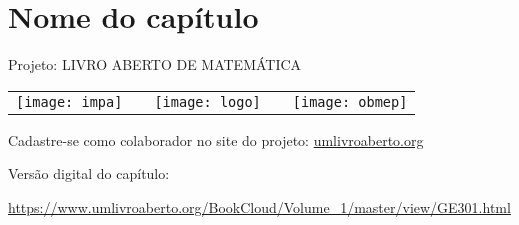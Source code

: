 \ifnum{} 
\renewcommand\chapterillustration{abertura-capitulo}
\else
\renewcommand\chapterillustration{abertura-capitulo-professor}
\fi

\renewcommand\chapterwhat{}

\renewcommand\chapterbecause{}


\chapter{Nome do capítulo}


\mbox{}\thispagestyle{empty}\clearpage

\thispagestyle{empty}

\begin{center}
Projeto: LIVRO ABERTO DE MATEMÁTICA

\noindent \begin{tabular}{lcccr}
\texttt{[image: impa]}& \quad\quad& \texttt{[image: logo]} & \quad\quad& \texttt{[image: obmep]} 
\end{tabular}
\end{center}

\vspace*{.3cm}

Cadastre-se como colaborador no site do projeto: \url{umlivroaberto.org}

Versão digital do capítulo:

\url{https://www.umlivroaberto.org/BookCloud/Volume_1/master/view/GE301.html}


